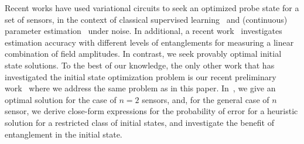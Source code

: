 Recent works have used variational circuits to seek an optimized probe 
state for a set of sensors, in the context of classical supervised learning~\cite{slaen}
and (continuous) parameter estimation~\cite{Koczor_2020} under noise. 
In additional, a recent work~\cite{ehrenberg} investigates estimation accuracy
with different levels of entanglements 
for measuring a linear combination of field amplitudes.
In contrast, we seek provably optimal initial state solutions. 
To the best of our knowledge, the only other work that has 
investigated the initial state optimization problem is 
our recent preliminary work~\cite{Hillery_2023} where we address the same 
problem as in this paper. 
In~\cite{Hillery_2023}, we give an optimal solution for the case of $n=2$ sensors,
and, for the general case of  $n$ sensor, we derive 
close-form expressions for the probability of error 
for a heuristic solution for a restricted class of initial 
states, and investigate the benefit of entanglement in the
initial state. 

